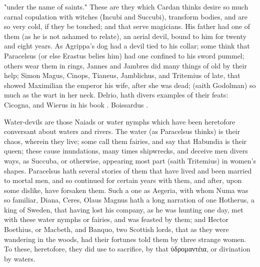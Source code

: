 "under the name of saints." These are they which Cardan thinks desire so much
carnal copulation with witches (Incubi and Succubi), transform bodies, and are
so very cold, if they be touched; and that serve magicians. His father had one
of them (as he is not ashamed to relate), an aerial devil,
bound to him for twenty and eight years. As Agrippa's dog had a devil tied to
his collar; some think that Paracelsus (or else Erastus belies him) had one
confined to his sword pummel; others wear them in rings, \etc{} Jannes and
Jambres did many things of old by their help; Simon Magus, Cinops, \Apollonius{}
Tianeus, Jamblichus, and Tritemius of late, that showed Maximilian the emperor
his wife, after she was dead;  (saith
Godolman) so much as the wart in her neck. Delrio,
 hath divers examples of their feats: Cicogna,
 and Wierus in his book
. Boissardus
.

Water-devils are those Naiads or water nymphs which have been heretofore
conversant about waters and rivers. The water (as Paracelsus thinks) is their
chaos, wherein they live; some call them fairies, and say that Habundia is
their queen; these cause inundations, many times shipwrecks, and deceive men
divers ways, as Succuba, or otherwise, appearing most part (saith Tritemius) in
women's shapes. Paracelsus hath several stories of them
that have lived and been married to mortal men, and so continued for certain
years with them, and after, upon some dislike, have forsaken them. Such a one
as Aegeria, with whom Numa was so familiar, Diana, Ceres, \etc{}
Olaus Magnus hath a long narration of one Hotherus, a king
of Sweden, that having lost his company, as he was hunting one day, met with
these water nymphs or fairies, and was feasted by them; and Hector Boethius, or
Macbeth, and Banquo, two Scottish lords, that as they were wandering in the
woods, had their fortunes told them by three strange women. To these,
heretofore, they did use to sacrifice, by that \textgreek{ὑδρομαντέια}, or
divination by waters.

